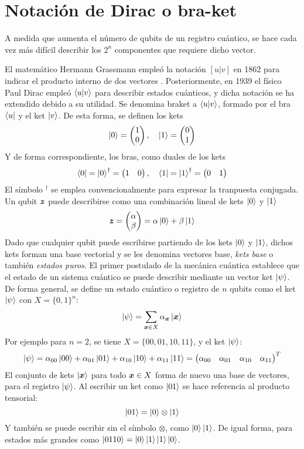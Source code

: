 \section{Notación de Dirac o bra-ket}
A medida que aumenta el número de qubits de un registro cuántico, se hace cada 
vez más difícil describir los $2^n$ componentes que requiere dicho vector.

El matemático Hermann Grassmann empleó la notación $[u|v]$ en 1862 para indicar 
el producto interno de dos vectores \cite{cajori-grassmann}. Posteriormente, en 
1939 el físico Paul Dirac empleó $\braket{u|v}$ para describir estados 
cuánticos, y dicha notación se ha extendido debido a su utilidad. Se denomina 
braket a $\braket{u|v}$, formado por el bra $\bra{u}$ y el ket $\ket{v}$.
%
De esta forma, se definen los kets
$$ \ket{0} = \begin{pmatrix} 1 \\ 0 \end{pmatrix}, \quad \ket{1} = \begin{pmatrix} 0 \\ 1 \end{pmatrix} $$
%
Y de forma correspondiente, los bras, como duales de los kets
$$ \bra{0} = \ket{0}^\dagger = \begin{pmatrix} 1 & 0 \end{pmatrix}, \quad
\bra 1 = \ket{1}^\dagger = \begin{pmatrix} 0 & 1 \end{pmatrix} $$
%
El símbolo $^\dagger$ se emplea convencionalmente para expresar la tranpuesta 
conjugada. Un qubit $\boldsymbol{z}$ puede describirse como una combinación lineal de kets 
$\ket{0}$ y $\ket{1}$
$$ \boldsymbol{z} = \begin{pmatrix} \alpha \\ \beta \end{pmatrix} = \alpha \ket{0} + \beta \ket{1}$$
Dado que cualquier qubit puede escribirse partiendo de los kets $\ket{0}$ y 
$\ket{1}$, dichos kets forman una base vectorial y se les denomina vectores 
base, \textit{kets base} o también \textit{estados puros}.
%
El primer postulado de la mecánica cuántica establece que el estado de un 
sistema cuántico se puede describir mediante un vector ket $\ket{\psi}$.
%
De forma general, se define un estado cuántico o registro de $n$ qubits como el 
ket $\ket{\psi}$ con $X = \{0,1\}^n$:
$$ \ket{\psi} = \sum_{\boldsymbol{x} \in X} \alpha_{\boldsymbol{x}} \ket{\boldsymbol{x}} $$
Por ejemplo para $n = 2$, se tiene $X = \{00, 01, 10, 11\}$, y el ket 
$\ket{\psi}$:
$$ \ket{\psi} = \alpha_{00} \ket{00} + \alpha_{01} \ket{01}
+ \alpha_{10} \ket{10} + \alpha_{11} \ket{11} =
\begin{pmatrix} \alpha_{00} & \alpha_{01} & \alpha_{10} & \alpha_{11} \end{pmatrix}^T $$
El conjunto de kets $\ket{\boldsymbol{x}}$ para todo $\boldsymbol{x} \in X$ forma de nuevo una base 
de vectores, para el registro $\ket{\psi}$. Al escribir un ket como $\ket{01}$ 
se hace referencia al producto tensorial:
$$ \ket{01} = \ket{0} \otimes \ket{1} $$
Y también se puede escribir sin el símbolo $\otimes$, como $\ket{0}\ket{1}$. De 
igual forma, para estados más grandes como $\ket{0110} = 
\ket{0}\ket{1}\ket{1}\ket{0}$.

